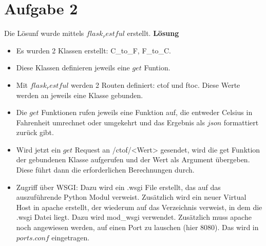 \documentclass[12pt, a4paper]{report}
\begin{document}
\section*{Aufgabe 2}
Die Lösunf wurde mittels $flask_restful$ erstellt.
\textbf{Lösung}
\begin{itemize}
	\item Es wurden 2 Klassen erstellt: C\_to\_F, F\_to\_C.
	\item Diese Klassen definieren jeweils eine $get$ Funtion.
	\item Mit $flask_restful$ werden 2 Routen definiert: ctof und ftoc. Diese Werte
	werden an jeweils eine Klasse gebunden.
	\item Die $get$ Funktionen rufen jeweils eine Funktion auf, die entweder Celsius in Fahrenheit umrechnet oder umgekehrt und das Ergebnis als $json$ formattiert zurück
	gibt.
	\item Wird jetzt ein $get$ Request an /ctof/<Wert> gesendet, wird die get Funktion der gebundenen Klasse aufgerufen und der Wert als Argument übergeben. Diese führt dann die erforderlichen Berechnungen durch.
	\item Zugriff über WSGI: Dazu wird ein .wsgi File erstellt, das auf das auszuführende Python Modul verweist. Zusätzlich wird ein neuer Virtual Host in apache erstellt, der wiederum auf das Verzeichnis verweist, in dem die .wsgi Datei liegt. Dazu wird mod\_wsgi verwendet. 
	Zusätzlich muss apache noch angewiesen werden, auf einen Port zu lauschen (hier 8080). Das wird in $ports.conf$ eingetragen.
	
\end{itemize}
\end{document}
